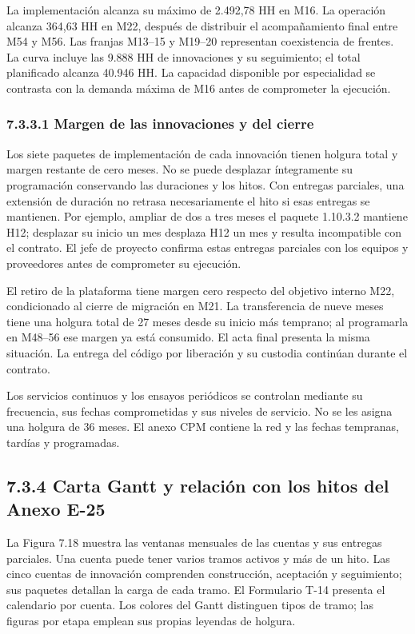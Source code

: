 \documentclass[11pt]{article}
\begin{document}
La implementación alcanza su máximo de 2.492,78 HH en M16. La operación alcanza 364,63 HH en M22, después de distribuir el acompañamiento final entre M54 y M56. Las franjas M13--15 y M19--20 representan coexistencia de frentes. La curva incluye las 9.888 HH de innovaciones y su seguimiento; el total planificado alcanza 40.946 HH. La capacidad disponible por especialidad se contrasta con la demanda máxima de M16 antes de comprometer la ejecución.

\subsubsection{7.3.3.1 Margen de las innovaciones y del cierre}

Los siete paquetes de implementación de cada innovación tienen holgura total y margen restante de cero meses. No se puede desplazar íntegramente su programación conservando las duraciones y los hitos. Con entregas parciales, una extensión de duración no retrasa necesariamente el hito si esas entregas se mantienen. Por ejemplo, ampliar de dos a tres meses el paquete 1.10.3.2 mantiene H12; desplazar su inicio un mes desplaza H12 un mes y resulta incompatible con el contrato. El jefe de proyecto confirma estas entregas parciales con los equipos y proveedores antes de comprometer su ejecución.

El retiro de la plataforma tiene margen cero respecto del objetivo interno M22, condicionado al cierre de migración en M21. La transferencia de nueve meses tiene una holgura total de 27 meses desde su inicio más temprano; al programarla en M48--56 ese margen ya está consumido. El acta final presenta la misma situación. La entrega del código por liberación y su custodia continúan durante el contrato.

Los servicios continuos y los ensayos periódicos se controlan mediante su frecuencia, sus fechas comprometidas y sus niveles de servicio. No se les asigna una holgura de 36 meses. El anexo CPM contiene la red y las fechas tempranas, tardías y programadas.

\subsection{7.3.4 Carta Gantt y relación con los hitos del Anexo E-25}

La Figura 7.18 muestra las ventanas mensuales de las cuentas y sus entregas parciales. Una cuenta puede tener varios tramos activos y más de un hito. Las cinco cuentas de innovación comprenden construcción, aceptación y seguimiento; sus paquetes detallan la carga de cada tramo. El Formulario T-14 presenta el calendario por cuenta. Los colores del Gantt distinguen tipos de tramo; las figuras por etapa emplean sus propias leyendas de holgura.
\end{document}
